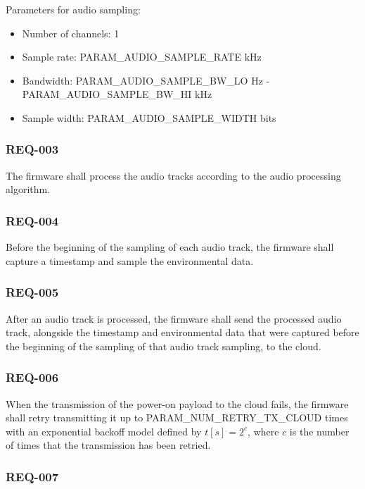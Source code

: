 \documentclass[11pt,a4paper]{article}
\begin{document}
Parameters for audio sampling:

\begin{itemize}
    \item Number of channels: 1
    \item Sample rate: PARAM\_AUDIO\_SAMPLE\_RATE kHz
    \item Bandwidth: PARAM\_AUDIO\_SAMPLE\_BW\_LO Hz -
          PARAM\_AUDIO\_SAMPLE\_BW\_HI kHz
    \item Sample width: PARAM\_AUDIO\_SAMPLE\_WIDTH bits
\end{itemize}

\subsubsection{REQ-003}

The firmware shall process the audio tracks according to the audio processing
algorithm.

\subsubsection{REQ-004}

Before the beginning of the sampling of each audio track, the firmware shall
capture a timestamp and sample the environmental data.

\subsubsection{REQ-005}

After an audio track is processed, the firmware shall send the processed audio
track, alongside the timestamp and environmental data that were captured before
the beginning of the sampling of that audio track sampling, to the cloud.

\subsubsection{REQ-006}

When the transmission of the power-on payload to the cloud fails, the firmware
shall retry transmitting it up to PARAM\_NUM\_RETRY\_TX\_CLOUD times with an
exponential backoff model defined by $t[s]=2^c$, where $c$ is the number of
times that the transmission has been retried.

\subsubsection{REQ-007}
\end{document}
